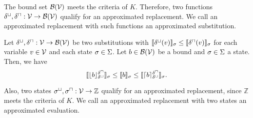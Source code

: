 The bound set $\mathcal{B}(\mathcal{V})$ meets the criteria of $K$.
Therefore, two functions $\delta^\sqcup, \delta^\sqcap: \mathcal{V} \rightarrow \mathcal{B}(\mathcal{V})$ qualify for an approximated replacement.
We call an approximated replacement with such functions an approximated substitution.


\begin{theorem}
  Let $\delta^\sqcup, \delta^\sqcap: \mathcal{V} \rightarrow \mathcal{B}(\mathcal{V})$ be two substitutions with $\llbracket \delta^\sqcup(v) \rrbracket_{\sigma} \leq \llbracket \delta^\sqcap(v) \rrbracket_{\sigma}$ for each variable $v \in \mathcal{V}$ and each state $\sigma \in \Sigma$.
  Let $b \in \mathcal{B}(\mathcal{V})$ be a bound and $\sigma \in \Sigma$ a state.
  Then, we have
  \[ \llbracket \lfloor b \rfloor^{\delta^\sqcap}_{\delta^\sqcup} \rrbracket_{\sigma} \leq \llbracket b \rrbracket_{\sigma} \leq \llbracket \lceil b \rceil^{\delta^\sqcap}_{\delta^\sqcup} \rrbracket_{\sigma}. \]
\end{theorem}

Also, two states ${\sigma^\sqcup}, {\sigma^\sqcap}: \mathcal{V} \rightarrow \mathbb{Z}$ qualify for an approximated replacement, since $\mathbb{Z}$ meets the criteria of $K$.
We call an approximated replacement with two states an approximated evaluation.


